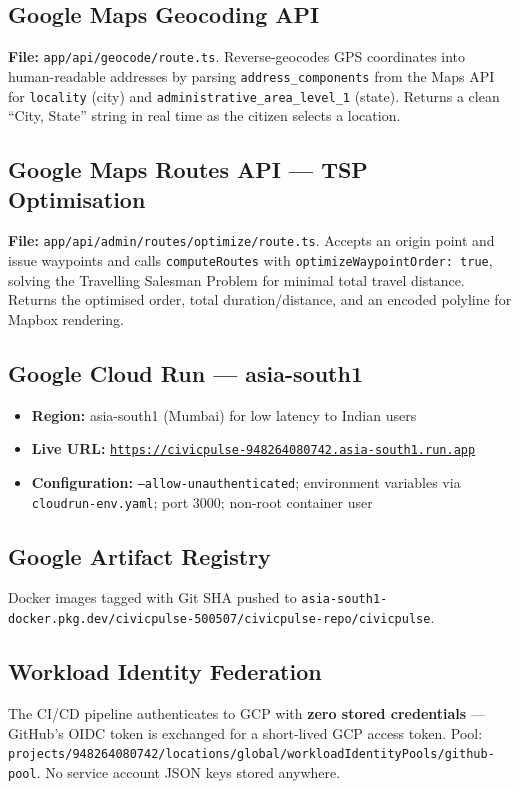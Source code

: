 \documentclass[11pt,a4paper]{article}
\newcommand{\tech}[1]{\texttt{\color{cpteal}#1}}
\newcommand{\file}[1]{\texttt{\footnotesize\color{cpgray}#1}}
\begin{document}
\subsection{Google Maps Geocoding API}
\textbf{File:} \file{app/api/geocode/route.ts}. Reverse-geocodes GPS coordinates into human-readable addresses by parsing \tech{address\_components} from the Maps API for \tech{locality} (city) and \tech{administrative\_area\_level\_1} (state). Returns a clean ``City, State'' string in real time as the citizen selects a location.

\subsection{Google Maps Routes API — TSP Optimisation}
\textbf{File:} \file{app/api/admin/routes/optimize/route.ts}. Accepts an origin point and issue waypoints and calls \tech{computeRoutes} with \tech{optimizeWaypointOrder: true}, solving the Travelling Salesman Problem for minimal total travel distance. Returns the optimised order, total duration/distance, and an encoded polyline for Mapbox rendering.

\subsection{Google Cloud Run — asia-south1}
\begin{itemize}
  \item \textbf{Region:} asia-south1 (Mumbai) for low latency to Indian users
  \item \textbf{Live URL:} \href{https://civicpulse-948264080742.asia-south1.run.app}{\tech{https://civicpulse-948264080742.asia-south1.run.app}}
  \item \textbf{Configuration:} \tech{--allow-unauthenticated}; environment variables via \tech{cloudrun-env.yaml}; port 3000; non-root container user
\end{itemize}

\subsection{Google Artifact Registry}
Docker images tagged with Git SHA pushed to \tech{asia-south1-docker.pkg.dev/\allowbreak civicpulse-500507/\allowbreak civicpulse-repo/\allowbreak civicpulse}.

\subsection{Workload Identity Federation}
The CI/CD pipeline authenticates to GCP with \textbf{zero stored credentials} — GitHub's OIDC token is exchanged for a short-lived GCP access token. Pool: \tech{projects/948264080742/locations/global/workloadIdentityPools/github-pool}. No service account JSON keys stored anywhere.
\end{document}
